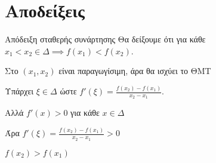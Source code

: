 \documentclass[greek]{beamer}
\begin{document}
\section{Αποδείξεις}
\begin{frame}{Απόδειξη σταθερής συνάρτησης}
 Θα δείξουμε ότι για κάθε $x_1<x_2\in Δ \implies f(x_1)<f(x_2)$.

  Στο $(x_1,x_2)$ είναι παραγωγίσιμη, άρα θα ισχύει το ΘΜΤ

  Υπάρχει $ξ\in Δ$ ώστε $f'(ξ)=\frac{f(x_2)-f(x_1)}{x_2-x_1}$.

  Αλλά $f'(x)>0$ για κάθε $x\in Δ$

  Άρα $f'(ξ)=\frac{f(x_2)-f(x_1)}{x_2-x_1}>0$

  $f(x_2)>f(x_1)$
\end{frame}
\end{document}
